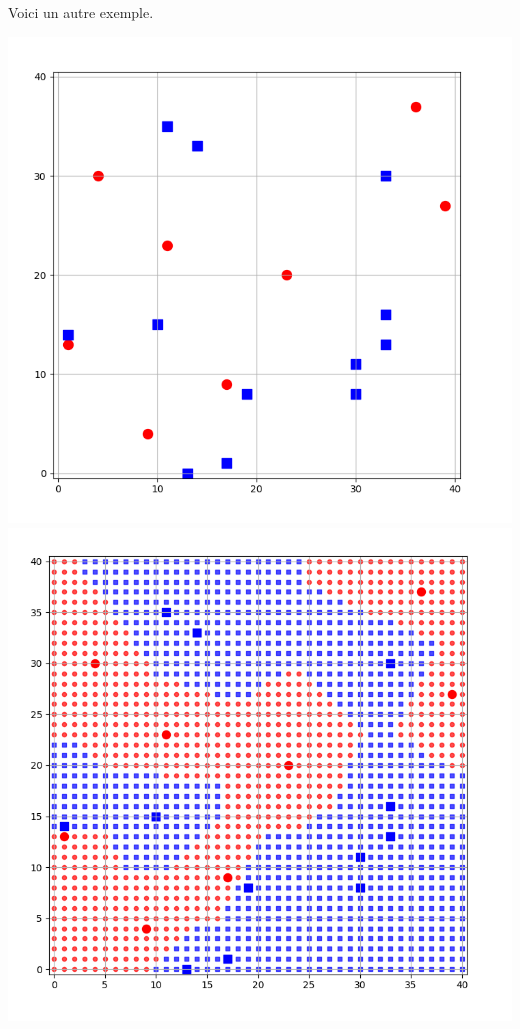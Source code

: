 \documentclass[11pt,class=report,crop=false]{standalone}
\begin{document}
\begin{activite}
\begin{enumerate}
	Voici un autre exemple.
	\begin{center}
	\includegraphics[scale=\myscale,scale=0.25]{ecran-voisins-6} \quad
	\includegraphics[scale=\myscale,scale=0.25]{ecran-voisins-7}
	\end{center}	
	

\end{enumerate}
\end{activite}
\end{document}
